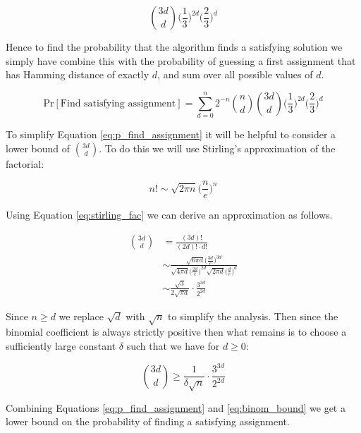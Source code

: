 \begin{equation}
    \binom{3d}{d} \Big( \frac{1}{3} \Big)^{2d} \Big( \frac{2}{3} \Big)^d
\end{equation}

Hence to find the probability that the algorithm finds a satisfying solution
we simply have combine this with the probability of guessing a first assignment
that has Hamming distance of exactly $d$, and sum over all possible values of $d$.

\begin{equation} \label{eq:p_find_assignment}
    \mathrm{Pr}[\text{Find satisfying assignment}] = \sum_{d=0}^{n} 2^{-n}\binom{n}{d}\binom{3d}{d} \Big( \frac{1}{3} \Big)^{2d} \Big( \frac{2}{3} \Big)^d
\end{equation}

To simplify Equation \ref{eq:p_find_assignment} it will be helpful to consider
a lower bound of $\binom{3d}{d}$. To do this we will use Stirling's approximation
of the factorial:

\begin{equation} \label{eq:stirling_fac}
    n! \sim \sqrt{2\pi n} \Big( \frac{n}{e} \Big)^n
\end{equation}

Using Equation \ref{eq:stirling_fac} we can derive an approximation as follows.

\begin{align*}
    \binom{3d}{d} &= \frac{(3d)!}{(2d)! \cdot d!} \\[5pt]
    &\sim \frac{\sqrt{6 \pi d}\Big(\frac{3d}{e}\Big)^{3d}}{\sqrt{4\pi d} \Big( \frac{2d}{e} \Big)^{2d}\sqrt{2\pi d} \Big( \frac{d}{e} \Big)^d} \\[5pt]
    &\sim \frac{\sqrt{3}}{2\sqrt{\pi d}} \cdot \frac{3^{3d}}{2^{2d}}
\end{align*}

Since $n \geq d$ we replace $\sqrt{d}$ with $\sqrt{n}$ to simplify the analysis.
Then since the binomial coefficient is always strictly positive then what
remains is to choose a sufficiently large constant $\delta$
such that we have for $d \geq 0$:

\begin{equation} \label{eq:binom_bound}
    \binom{3d}{d} \geq \frac{1}{\delta \sqrt{n}} \cdot \frac{3^{3d}}{2^{2d}}
\end{equation}

Combining Equations \ref{eq:p_find_assignment} and \ref{eq:binom_bound} we get
a lower bound on the probability of finding a satisfying assignment.


